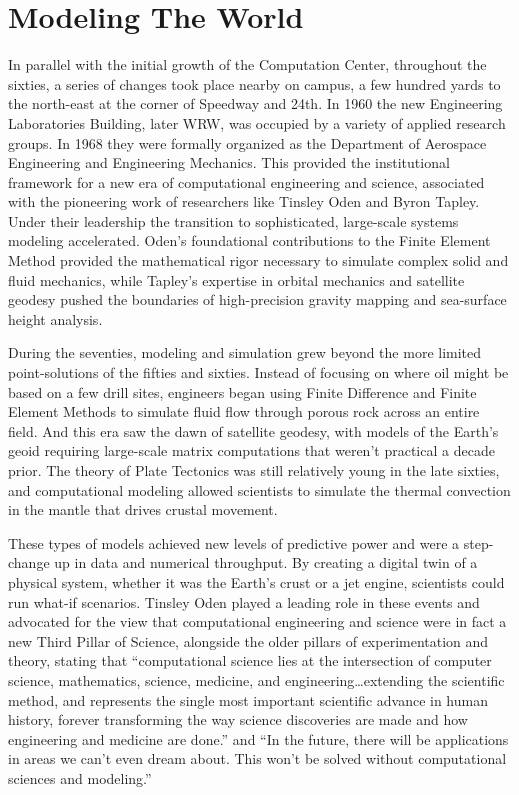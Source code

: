 \chapter{Modeling The World}

In parallel with the initial growth of the Computation Center, throughout the sixties, a series of changes took place nearby on campus, a few hundred yards to the north-east at the corner of Speedway and 24th. In 1960 the new Engineering Laboratories Building, later WRW, was occupied by a variety of applied research groups. In 1968 they were formally organized as the Department of Aerospace Engineering and Engineering Mechanics. This provided the institutional framework for a new era of computational engineering and science, associated with the pioneering work of researchers like Tinsley Oden and Byron Tapley. Under their leadership the transition to sophisticated, large-scale systems modeling accelerated. Oden’s foundational contributions to the Finite Element Method provided the mathematical rigor necessary to simulate complex solid and fluid mechanics, while Tapley’s expertise in orbital mechanics and satellite geodesy pushed the boundaries of high-precision gravity mapping and sea-surface height analysis. 

During the seventies, modeling and simulation grew beyond the more limited point-solutions of the fifties and sixties. Instead of focusing on where oil might be based on a few drill sites, engineers began using Finite Difference and Finite Element Methods to simulate fluid flow through porous rock across an entire field. And this era saw the dawn of satellite geodesy, with models of the Earth’s geoid requiring large-scale matrix computations that weren't practical a decade prior. The theory of Plate Tectonics was still relatively young in the late sixties, and computational modeling allowed scientists to simulate the thermal convection in the mantle that drives crustal movement. 

These types of models achieved new levels of predictive power and were a step-change up in data and numerical throughput. By creating a digital twin of a physical system, whether it was the Earth's crust or a jet engine, scientists could run what-if scenarios. Tinsley Oden played a leading role in these events and advocated for the view that computational engineering and science were in fact a new Third Pillar of Science, alongside the older pillars of experimentation and theory, stating that “computational science lies at the intersection of computer science, mathematics, science, medicine, and engineering…extending the scientific method, and represents the single most important scientific advance in human history, forever transforming the way science discoveries are made and how engineering and medicine are done.” and “In the future, there will be applications in areas we can’t even dream about. This won’t be solved without computational sciences and modeling.” 


